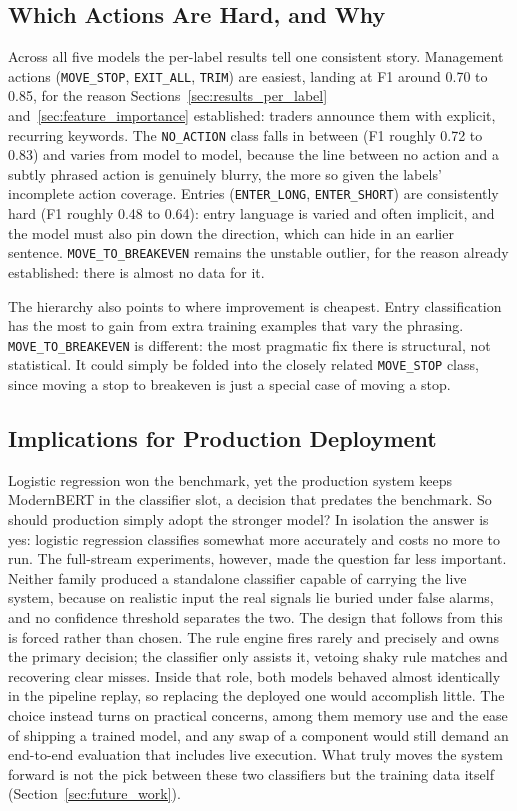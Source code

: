 \subsection{Which Actions Are Hard, and Why}
\label{sec:discussion_hierarchy}

Across all five models the per-label results tell one consistent story. Management actions (\texttt{MOVE\_STOP}, \texttt{EXIT\_ALL}, \texttt{TRIM}) are easiest, landing at F1 around 0.70 to 0.85, for the reason Sections~\ref{sec:results_per_label} and~\ref{sec:feature_importance} established: traders announce them with explicit, recurring keywords. The \texttt{NO\_ACTION} class falls in between (F1 roughly 0.72 to 0.83) and varies from model to model, because the line between no action and a subtly phrased action is genuinely blurry, the more so given the labels' incomplete action coverage. Entries (\texttt{ENTER\_LONG}, \texttt{ENTER\_SHORT}) are consistently hard (F1 roughly 0.48 to 0.64): entry language is varied and often implicit, and the model must also pin down the direction, which can hide in an earlier sentence. \texttt{MOVE\_TO\_BREAKEVEN} remains the unstable outlier, for the reason already established: there is almost no data for it.

The hierarchy also points to where improvement is cheapest. Entry classification has the most to gain from extra training examples that vary the phrasing. \texttt{MOVE\_TO\_BREAKEVEN} is different: the most pragmatic fix there is structural, not statistical. It could simply be folded into the closely related \texttt{MOVE\_STOP} class, since moving a stop to breakeven is just a special case of moving a stop.

\subsection{Implications for Production Deployment}
\label{sec:discussion_production}

Logistic regression won the benchmark, yet the production system keeps ModernBERT in the classifier slot, a decision that predates the benchmark. So should production simply adopt the stronger model? In isolation the answer is yes: logistic regression classifies somewhat more accurately and costs no more to run. The full-stream experiments, however, made the question far less important. Neither family produced a standalone classifier capable of carrying the live system, because on realistic input the real signals lie buried under false alarms, and no confidence threshold separates the two. The design that follows from this is forced rather than chosen. The rule engine fires rarely and precisely and owns the primary decision; the classifier only assists it, vetoing shaky rule matches and recovering clear misses. Inside that role, both models behaved almost identically in the pipeline replay, so replacing the deployed one would accomplish little. The choice instead turns on practical concerns, among them memory use and the ease of shipping a trained model, and any swap of a component would still demand an end-to-end evaluation that includes live execution. What truly moves the system forward is not the pick between these two classifiers but the training data itself (Section~\ref{sec:future_work}).

